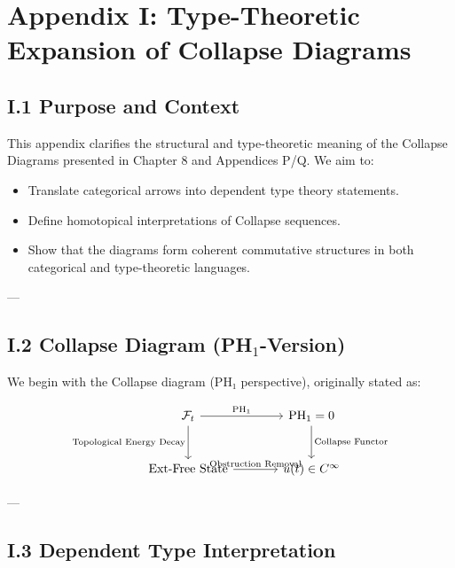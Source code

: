 \documentclass[11pt]{article}
\begin{document}

\section*{Appendix I: Type-Theoretic Expansion of Collapse Diagrams}

\subsection*{I.1 Purpose and Context}

This appendix clarifies the structural and type-theoretic meaning of the Collapse Diagrams  
presented in Chapter 8 and Appendices P/Q. We aim to:

\begin{itemize}
  \item Translate categorical arrows into dependent type theory statements.
  \item Define homotopical interpretations of Collapse sequences.
  \item Show that the diagrams form coherent commutative structures in both categorical and type-theoretic languages.
\end{itemize}

---

\subsection*{I.2 Collapse Diagram (PH\(_1\)-Version)}

We begin with the Collapse diagram (PH₁ perspective), originally stated as:

\[
\begin{tikzcd}[row sep=large, column sep=large]
\mathcal{F}_t
  \arrow[r, "{\mathrm{PH}_1}"]
  \arrow[d, "{\text{Topological Energy Decay}}"']
& \mathrm{PH}_1 = 0
  \arrow[d, "{\text{Collapse Functor}}"] \\
\text{Ext-Free State}
  \arrow[r, "{\text{Obstruction Removal}}"]
& u(t) \in C^\infty
\end{tikzcd}
\]

---

\subsection*{I.3 Dependent Type Interpretation}
\end{document}
